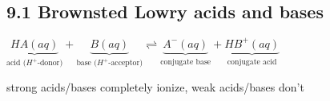 \subsection*{9.1 Brownsted Lowry acids and bases}
    \begin{center}$
        \underbrace{HA (aq)}_\text{acid ($H^+$-donor)} + \underbrace{B (aq)}_\text{base ($H^+$-acceptor)} \rightleftharpoons \underbrace{A^- (aq)}_\text{conjugate base} + \underbrace{HB^+ (aq)}_\text{conjugate acid}
    $\end{center}
    strong acids/bases completely ionize, weak acids/bases don't